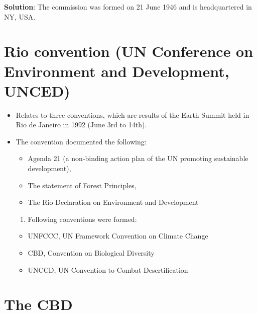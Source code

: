 \documentclass[
  openany]{book}
\providecommand{\tightlist}{%
  \setlength{\itemsep}{0pt}\setlength{\parskip}{0pt}}
\newenvironment{solution}{ {\bfseries Solution}:}{}
\begin{document}
\begin{questions}
\begin{solution}
The commission was formed on 21 June 1946 and is headquartered in NY, USA.

\end{solution}

\end{questions}

\hypertarget{rio-convention-un-conference-on-environment-and-development-unced}{%
\section{Rio convention (UN Conference on Environment and Development, UNCED)}\label{rio-convention-un-conference-on-environment-and-development-unced}}

\begin{itemize}
\tightlist
\item
  Relates to three conventions, which are results of the Earth Summit held in Rio de Janeiro in 1992 (June 3rd to 14th).
\item
  The convention documented the following:

  \begin{itemize}
  \tightlist
  \item
    Agenda 21 (a non-binding action plan of the UN promoting sustainable development),
  \item
    The statement of Forest Principles,
  \item
    The Rio Declaration on Environment and Development
  \end{itemize}

  \begin{enumerate}
  \def\labelenumi{\arabic{enumi}.}
  \setcounter{enumi}{61}
  \tightlist
  \item
    Following conventions were formed:
  \end{enumerate}

  \begin{itemize}
  \tightlist
  \item
    UNFCCC, UN Framework Convention on Climate Change
  \item
    CBD, Convention on Biological Diversity
  \item
    UNCCD, UN Convention to Combat Desertification
  \end{itemize}
\end{itemize}

\hypertarget{the-cbd}{%
\section{The CBD}\label{the-cbd}}
\end{document}
